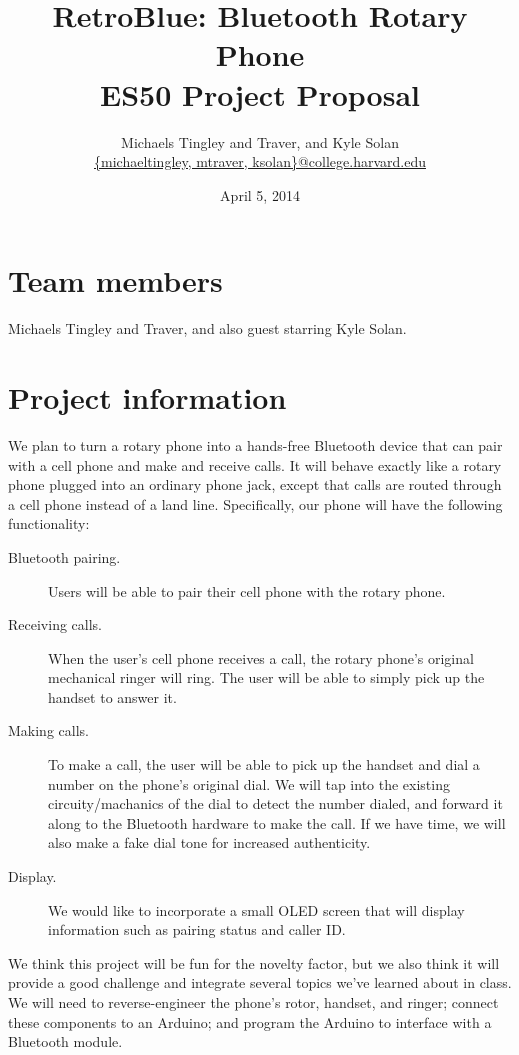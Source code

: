 \documentclass[11pt]{article}
\title{RetroBlue: Bluetooth Rotary Phone\\ES50 Project Proposal}
\author{Michaels Tingley and Traver, and Kyle Solan\\\url{{michaeltingley, mtraver, ksolan}@college.harvard.edu}}
\date{April 5, 2014}
\begin{document}
    \maketitle

    \section{Team members}
        Michaels Tingley and Traver, and also guest starring Kyle Solan.

    \section{Project information}
        We plan to turn a rotary phone into a hands-free Bluetooth device that can pair with a cell phone and make and receive calls. It will behave exactly like a rotary phone plugged into an ordinary phone jack, except that calls are routed through a cell phone instead of a land line. Specifically, our phone will have the following functionality:

        \begin{description}
            \item[Bluetooth pairing.] Users will be able to pair their cell phone with the rotary phone.
            \item[Receiving calls.] When the user's cell phone receives a call, the rotary phone's original mechanical ringer will ring. The user will be able to simply pick up the handset to answer it.
            \item[Making calls.] To make a call, the user will be able to pick up the handset and dial a number on the phone's original dial. We will tap into the existing circuity/machanics of the dial to detect the number dialed, and forward it along to the Bluetooth hardware to make the call. If we have time, we will also make a fake dial tone for increased authenticity.
            \item[Display.] We would like to incorporate a small OLED screen that will display information such as pairing status and caller ID.
        \end{description}

        We think this project will be fun for the novelty factor, but we also think it will provide a good challenge and integrate several topics we've learned about in class. We will need to reverse-engineer the phone's rotor, handset, and ringer; connect these components to an Arduino; and program the Arduino to interface with a Bluetooth module.
\end{document}
